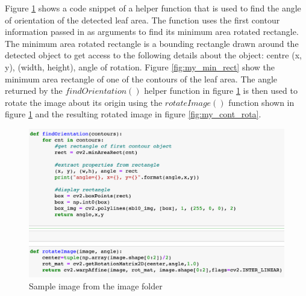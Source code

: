Figure \ref{fig:my_find_orien_rotate} shows a code snippet of a helper function that is used to find the angle of orientation of the detected leaf area. The function uses the first contour information passed in as arguments to find its minimum area rotated rectangle. The minimum area rotated rectangle is a bounding rectangle drawn around the detected object to get access to the following details about the object: centre (x, y), (width, height), angle of rotation. Figure \ref{fig:my_min_rect} show the minimum area rectangle of one of the contours of the leaf area. The angle returned by the $findOrientation()$ helper function in figure \ref{fig:my_find_orien_rotate} is then used to rotate the image about its origin using the $rotateImage()$ function shown in figure \ref{fig:my_find_orien_rotate} and the resulting rotated image in figure \ref{fig:my_cont_rota}.


\begin{figure}[!htb]
    \centering
    \includegraphics[scale=0.65, keepaspectratio]{Figures/find_orien_rotate.png}
    \caption{Sample image from the image folder}
    \label{fig:my_find_orien_rotate}
\end{figure} 



